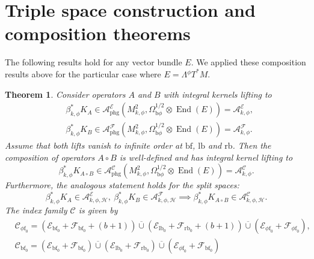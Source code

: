 \documentclass[JEP,XML,SOM,Unicode,NoFloatCountersInSection,published]{cedram}
\newcommand{\bphi}{{\bb\phi}}
\theoremstyle{plain}
\newtheorem{Th}{Theorem}[section]
\theoremstyle{definition}
\newcommand{\Hmath}{{\mathscr{H}}}
\newcommand\calA{{\mathcal A}}
\newcommand\calE{{\mathcal E}}
\newcommand\calF{{\mathcal F}}
\newcommand {\phg}{{\mathrm{phg}}}
\newcommand{\phif}{{\phi\mathrm{f}}}
\newcommand{\lf}{{\mathrm{lb}}}
\newcommand{\rf}{{\mathrm{rb}}}
\newcommand{\bb}{{\mathrm{b}}}
\newcommand{\rfz}{{\mathrm{rb}_0}}
\newcommand{\bbf}{{\mathrm{bf}}}
\newcommand{\bfz}{{\bbf_0}}
\DeclareMathOperator{\End}{End}
\begin{document}
\section{Triple space construction and composition theorems} \label{section 6}
The following results hold for any vector bundle $E$.
We applied these composition results above for the particular case
where $E= \Lambda {}^\phi T^*M$.

\begin{Th} \label{compositionth-smooth}
Consider operators $A$ and $B$ with integral kernels lifting to
\begin{equation}
\begin{split}
&\beta_{k,\phi}^*K_{A} \in \mathcal{A}_{\phg}^{\mathcal{E}}(M^2_{k,\phi}, \Omega_{\bphi}^{1/2}
\otimes \End(E)) = \mathcal{A}^{\mathcal{E}}_{k,\phi}, \\
&\beta_{k,\phi}^*K_{B} \in \mathcal{A}_{\phg}^{\mathcal{F}}(M^2_{k,\phi}, \Omega_{\bphi}^{1/2}
\otimes \End(E)) = \mathcal{A}^{\mathcal{F}}_{k,\phi}.
\end{split}
\end{equation}
Assume that both lifts vanish to infinite order at $\bbf$, $\lf$ and $\rf$. Then the composition of operators $A \circ B$
is well-defined and has integral kernel lifting to
\begin{equation}
\label{eqn:AB}
\beta_{k,\phi}^*K_{A \circ B} \in \mathcal{A}_{\phg}^{\mathscr{C}}(M^2_{k,\phi}, \Omega_{\bphi}^{1/2}
\otimes \End(E)) = \mathcal{A}^{\mathscr{C}}_{k,\phi}.
\end{equation}
Furthermore, the analogous statement holds for the split spaces:
\begin{equation}
\label{eqn:AB split}
\beta_{k,\phi}^*K_{A}\in \calA^\calE_{k,\phi,\Hmath},\ \beta_{k,\phi}^* K_{B} \in\calA^\calF_{k,\phi,\Hmath}\implies
\beta_{k,\phi}^*K_{A\circ B} \in \calA^{\mathscr{C}}_{k,\phi,\Hmath}.
\end{equation}
The index family $\mathscr{C}$ is given by
\begin{equation}\label{composition-index-family}
\begin{split}
&\mathscr{C}_{\phif_0} = \left(\mathcal{E}_{\bbf_0} + \mathcal{F}_{\bbf_0} + (b+1)\right)
\overline{\cup} \left(\mathcal{E}_{\lf_0} + \mathcal{F}_{\rf_0} + (b+1)\right)
\overline{\cup} \left(\mathcal{E}_{\phif_0} + \mathcal{F}_{\phif_0} \right), \\
&\mathscr{C}_{\bfz} = (\mathcal{E}_{\bfz} + \mathcal{F}_{\bfz})
\overline{\cup} (\mathcal{E}_{\lf_{0}} + \mathcal{F}_{\rfz}) \overline{\cup} (\mathcal{E}_{\phif_0} + \mathcal{F}_{\bbf_0})

\end{split}
\end{equation}
\end{Th}
\end{document}
